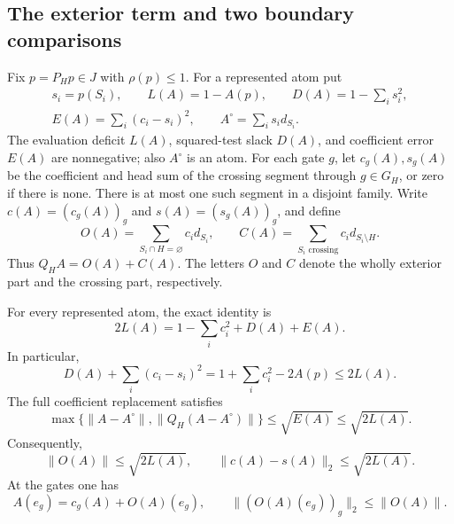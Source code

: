 \subsection{The exterior term and two boundary comparisons}
\label{stab:coef:boundary}

Fix $p=P_Hp\in J$ with $\rho(p)\le1$. For a represented atom put
\[
 \begin{gathered}
 s_i=p(S_i),\qquad L(A)=1-A(p),\qquad D(A)=1-\sum_i s_i^2,\\
 E(A)=\sum_i(c_i-s_i)^2,\qquad A^\circ=\sum_i s_i d_{S_i}.
 \end{gathered}
\]
The evaluation deficit $L(A)$, squared-test slack $D(A)$, and
coefficient error $E(A)$ are nonnegative; also $A^\circ$ is an atom.
For each gate $g$, let $c_g(A),s_g(A)$ be the coefficient and head sum
of the crossing segment through $g\in G_H$, or zero if there is none.
There is at most one such segment in a disjoint family. Write
$c(A)=(c_g(A))_g$ and $s(A)=(s_g(A))_g$, and define
\[
 O(A)=\sum_{S_i\cap H=\varnothing}c_i d_{S_i},\qquad
 C(A)=\sum_{S_i\text{ crossing}}c_i d_{S_i\setminus H}.
\]
Thus $Q_HA=O(A)+C(A)$. The letters $O$ and $C$ denote the wholly
exterior part and the crossing part, respectively.

\begin{lemma}\label{stab:coef:pointwise}
For every represented atom, the exact identity is
\begin{equation}\label{stab:deficit-identity}
 2L(A)=1-\sum_i c_i^2+D(A)+E(A).
\end{equation}
In particular,
\begin{equation}\label{stab:coef:budget}
 D(A)+\sum_i(c_i-s_i)^2
 =1+\sum_i c_i^2-2A(p)\le2L(A).
\end{equation}
The full coefficient replacement satisfies
\begin{equation}\label{stab:toolkit:replacement}
 \max\{\|A-A^\circ\|,\|Q_H(A-A^\circ)\|\}
 \le\sqrt{E(A)}\le\sqrt{2L(A)}.
\end{equation}
Consequently,
\begin{equation}\label{stab:coef:exterior}
 \|O(A)\|\le\sqrt{2L(A)},\qquad
 \|c(A)-s(A)\|_2\le\sqrt{2L(A)}.
\end{equation}
At the gates one has
\begin{equation}\label{stab:coef:gate-coordinates}
 A(e_g)=c_g(A)+O(A)(e_g),\qquad
 \|(O(A)(e_g))_g\|_2\le\|O(A)\|.
\end{equation}
\end{lemma}


